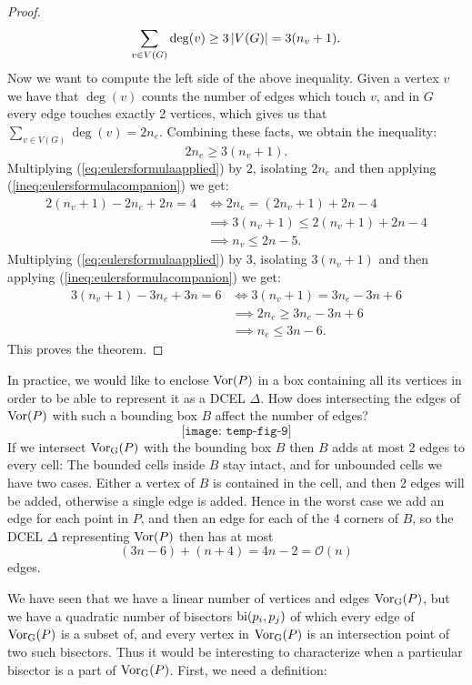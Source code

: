 \begin{proof}
\[
    \sum_{v \in V(G)} \deg(v) \geq 3 \left\lvert V(G) \right\rvert = 3(n_v + 1).
\]
Now we want to compute the left side of the above inequality. Given a vertex $v$ we have that $\deg(v)$ counts the number of edges which touch $v$, and in $G$ every edge touches exactly 2 vertices, which gives us that $\sum_{v \in V(G)} \deg(v) = 2 n_e$. Combining these facts, we obtain the inequality:
\begin{equation} \label{ineq:eulersformulacompanion}
    2 n_e \geq 3(n_v + 1).
\end{equation}
Multiplying (\ref{eq:eulersformulaapplied}) by $2$, isolating $2 n_e$ and then applying (\ref{ineq:eulersformulacompanion}) we get:
\begin{align*}
    2 (n_v + 1) - 2 n_e + 2 n = 4
    &\iff 2 n_e = (2 n_v + 1) + 2n - 4 \\
    &\implies 3(n_v + 1) \leq 2 (n_v + 1) + 2n - 4 \\
    &\implies n_v \leq 2n - 5.
\end{align*}
Multiplying (\ref{eq:eulersformulaapplied}) by $3$, isolating $3 (n_v + 1)$ and then applying (\ref{ineq:eulersformulacompanion}) we get:
\begin{align*}
    3 (n_v + 1) - 3 n_e + 3 n = 6
    &\iff 3 (n_v + 1) = 3 n_e - 3n + 6 \\
    &\implies 2 n_e \geq 3n_e - 3n + 6 \\
    &\implies n_e \leq 3n - 6.
\end{align*}
This proves the theorem.
\end{proof}
\begin{rmk} \label{rmk:boxalsohaslinearnumedges}
In practice, we would like to enclose $\operatorname{Vor}(P)$ in a box containing all its vertices in order to be able to represent it as a DCEL $\Delta$. How does intersecting the edges of $\operatorname{Vor}(P)$ with such a bounding box $B$ affect the number of edges?
\[
    \texttt{[image: temp-fig-9]}
\]
If we intersect $\operatorname{Vor_{G}}(P)$ with the bounding box $B$ then $B$ adds at most 2 edges to every cell: The bounded cells inside $B$ stay intact, and for unbounded cells we have two cases. Either a vertex of $B$ is contained in the cell, and then 2 edges will be added, otherwise a single edge is added. Hence in the worst case we add an edge for each point in $P$, and then an edge for each of the 4 corners of $B$, so the DCEL $\Delta$ representing $\operatorname{Vor}(P)$ then has at most
\[
    (3n - 6) + (n + 4) = 4n - 2 = \mathcal{O}(n)
\]
edges.
\end{rmk}
We have seen that we have a linear number of vertices and edges $\operatorname{Vor_{G}}(P)$, but we have a quadratic number of bisectors $\operatorname{bi}(p_i, p_j)$ of which every edge of $\operatorname{Vor_{G}}(P)$ is a subset of, and every vertex in $\operatorname{Vor_{G}}(P)$ is an intersection point of two such bisectors. Thus it would be interesting to characterize when a particular bisector is a part of $\operatorname{Vor_{G}}(P)$. First, we need a definition:

